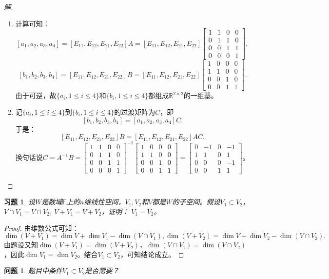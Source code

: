 \documentclass[UTF8]{ctexart}
\newtheorem{ques}[thm]{问题}
\newtheorem{ex}[thm]{习题}
\begin{document}
\begin{proof}[解]
\begin{enumerate}
\item
计算可知：
\[
[a_1, a_2, a_3, a_4] = [E_{11}, E_{12}, E_{21}, E_{22}] A = [E_{11}, E_{12}, E_{21}, E_{22}] \begin{bmatrix}
1 & 1 & 0 & 0  \\
0 & 1 & 1 & 0  \\
0 & 0 & 1 & 1 \\
0 & 0 & 0 & 1 
\end{bmatrix},
\]
\[
[b_1, b_2, b_3, b_4] = [E_{11}, E_{12}, E_{21}, E_{22}] B = [E_{11}, E_{12}, E_{21}, E_{22}] \begin{bmatrix}
1 & 0 & 0 & 0  \\
1 & 1 & 0 & 0  \\
0 & 0 & 1 & 0 \\
0 & 0 & 1 & 1 
\end{bmatrix}.
\]
由于可逆，故$\{a_{i}, 1 \leq i \leq 4\}$和$\{b_{i}, 1 \leq i \leq 4\}$都组成$\mathbb{R}^{2 \times 2}$的一组基。
\item
记$\{a_{i}, 1 \leq i \leq 4\}$到$\{b_{i}, 1 \leq i \leq 4\}$的过渡矩阵为$C$，即
\[
[b_1, b_2, b_3, b_4] = [a_1, a_2, a_3, a_4]C.
\]
于是：
\[
[E_{11}, E_{12}, E_{21}, E_{22}] B = [E_{11}, E_{12}, E_{21}, E_{22}] A C. 
\]
换句话说$C = A^{-1}B = \begin{bmatrix}
1 & 1 & 0 & 0  \\
0 & 1 & 1 & 0  \\
0 & 0 & 1 & 1 \\
0 & 0 & 0 & 1 
\end{bmatrix}^{-1} \begin{bmatrix}
1 & 0 & 0 & 0  \\
1 & 1 & 0 & 0  \\
0 & 0 & 1 & 0 \\
0 & 0 & 1 & 1 
\end{bmatrix} = \begin{bmatrix}
0 & -1 & 0 & -1  \\
1 & 1 & 0 & 1  \\
0 & 0 & 0 & -1 \\
0 & 0 & 1 & 1 
\end{bmatrix}$。
\end{enumerate}
\end{proof}
\begin{ex} 
设$W$是数域$\mathbb{F}$上的$n$维线性空间，$V_1, V_2$和$V$都是$W$的子空间。假设$V_1 \subset V_2$，$V\cap V_1 = V\cap V_2$, $V+ V_1=V+V_2$，证明：
$V_1 = V_2$。
\end{ex}
\begin{proof}
由维数公式可知：
\[
\dim(V+ V_1) = \dim V + \dim V_1 - \dim(V \cap V_1), \dim(V+ V_2) = \dim V + \dim V_2 - \dim(V\cap V_2).
\]
由题设又知$\dim(V+V_1) = \dim(V+V_2)$，$\dim(V\cap V_1) = \dim(V\cap V_2)$，因此$\dim V_1 = \dim V_2$。结合$V_1 \subset V_2$，可知结论成立。
\end{proof}
\begin{ques}
题目中条件$V_1 \subset V_2$是否需要？
\end{ques}
\end{document}
